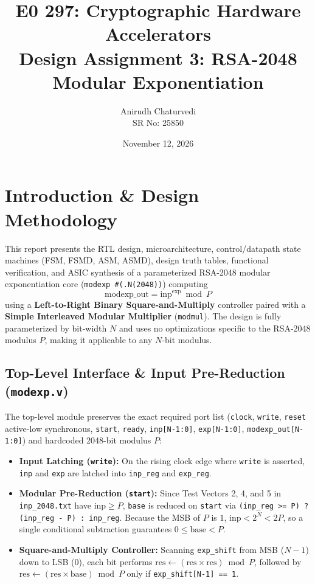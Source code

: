 \documentclass[11pt,a4paper]{article}
\title{\textbf{E0 297: Cryptographic Hardware Accelerators} \\[4pt]
\Large Design Assignment 3: RSA-2048 Modular Exponentiation}
\author{Anirudh Chaturvedi \\ SR No: 25850}
\date{November 12, 2026}
\begin{document}
\maketitle

\section{Introduction \& Design Methodology}
This report presents the RTL design, microarchitecture, control/datapath state machines (FSM, FSMD, ASM, ASMD), design truth tables, functional verification, and ASIC synthesis of a parameterized RSA-2048 modular exponentiation core (\texttt{modexp \#(.N(2048))}) computing
\[
\text{modexp\_out} = \text{inp}^{\text{exp}} \bmod P
\]
using a \textbf{Left-to-Right Binary Square-and-Multiply} controller paired with a \textbf{Simple Interleaved Modular Multiplier} (\texttt{modmul}). The design is fully parameterized by bit-width $N$ and uses no optimizations specific to the RSA-2048 modulus $P$, making it applicable to any $N$-bit modulus.

\subsection{Top-Level Interface \& Input Pre-Reduction (\texttt{modexp.v})}
The top-level module preserves the exact required port list (\texttt{clock}, \texttt{write}, \texttt{reset} active-low synchronous, \texttt{start}, \texttt{ready}, \texttt{inp[N-1:0]}, \texttt{exp[N-1:0]}, \texttt{modexp\_out[N-1:0]}) and hardcoded 2048-bit modulus $P$:
\begin{itemize}
    \item \textbf{Input Latching (\texttt{write}):} On the rising clock edge where \texttt{write} is asserted, \texttt{inp} and \texttt{exp} are latched into \texttt{inp\_reg} and \texttt{exp\_reg}.
    \item \textbf{Modular Pre-Reduction (\texttt{start}):} Since Test Vectors 2, 4, and 5 in \texttt{inp\_2048.txt} have $\text{inp} \ge P$, \texttt{base} is reduced on \texttt{start} via \texttt{(inp\_reg >= P) ? (inp\_reg - P) : inp\_reg}. Because the MSB of $P$ is $1$, $\text{inp} < 2^N < 2P$, so a single conditional subtraction guarantees $0 \le \text{base} < P$.
    \item \textbf{Square-and-Multiply Controller:} Scanning \texttt{exp\_shift} from MSB ($N-1$) down to LSB ($0$), each bit performs $\text{res} \leftarrow (\text{res} \times \text{res}) \bmod P$, followed by $\text{res} \leftarrow (\text{res} \times \text{base}) \bmod P$ only if \texttt{exp\_shift[N-1] == 1}.
\end{itemize}
\end{document}
